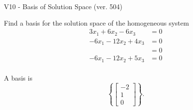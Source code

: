 \begin{exercise}
  \begin{exerciseTitle}V10 - Basis of Solution Space (ver. 504)\end{exerciseTitle}
  \begin{exerciseStatement}
    Find a basis for the solution space of the homogeneous system 
\begin{align*}
 3 x_ 1 + 6 x_ 2 -6 x_ 3 &= 0  \\ 
  -6 x_ 1 -12 x_ 2 + 4 x_ 3 &= 0  \\ 
  &= 0  \\ 
  -6 x_ 1 -12 x_ 2 + 5 x_ 3 &= 0  \\ 
 \end{align*}


 
  \end{exerciseStatement}

  \begin{exerciseAnswer}
   A basis is   
\[\left\{\left[\begin{array}{c}
-2 \\
1 \\
0
\end{array}\right]\right\}.\]

  


  \end{exerciseAnswer}
\end{exercise}